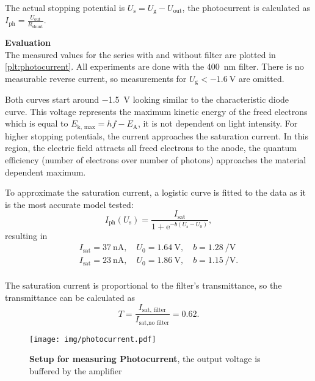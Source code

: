The actual stopping potential is $U_\text{s} = U_\text{g} - U_\text{out}$, the photocurrent is calculated as $I_\text{ph} = \frac{U_\text{out}}{R_\text{shunt}}$.

\textbf{Evaluation}\\
The measured values for the series with and without filter are plotted in \autoref{plt:photocurrent}.
All experiments are done with the \SI{400}{\nm} filter.
There is no measurable reverse current, so measurements for $U_\text{g} < \SI{-1.6}{\volt}$ are omitted.

Both curves start around \SI{-1.5}{\volt} looking similar to the characteristic diode curve.
This voltage represents the maximum kinetic energy of the freed electrons which is equal to $E_\text{k, max} = hf - E_\text{A}$, it is not dependent on light intensity.
For higher stopping potentials, the current approaches the saturation current.
In this region, the electric field attracts all freed electrons to the anode, the quantum efficiency (number of electrons over number of photons) approaches the material dependent maximum.

To approximate the saturation current, a logistic curve is fitted to the data as it is the most accurate model tested:
\begin{equation*}
	I_\text{ph}(U_\text{s}) = \frac{I_\text{sat}}{1 + \mathrm{e}^{-b (U_\text{s} - U_0)}},
\end{equation*}
resulting in
\begin{gather*}
	I_\text{sat} = \SI{37}{\nA}, \quad U_0 = \SI{1.64}{\volt}, \quad b = \SI{1.28}{\per\volt} \tag{no filter}\\
	I_\text{sat} = \SI{23}{\nA}, \quad U_0 = \SI{1.86}{\volt}, \quad b = \SI{1.15}{\per\volt}. \tag{filter}\\
\end{gather*}

The saturation current is proportional to the filter's transmittance, so the transmittance can be calculated as
\begin{equation*}
	T = \frac{I_\text{sat, filter}}{I_\text{sat,no filter}} = \num{0.62}.
\end{equation*}

\begin{figure}[tbp]
	\centering
	\texttt{[image: img/photocurrent.pdf]}
	\caption[Setup for measuring Photocurrent]{\textbf{Setup for measuring Photocurrent}, the output voltage is buffered by the amplifier}
	\label{sch:photocurrent}
\end{figure}

